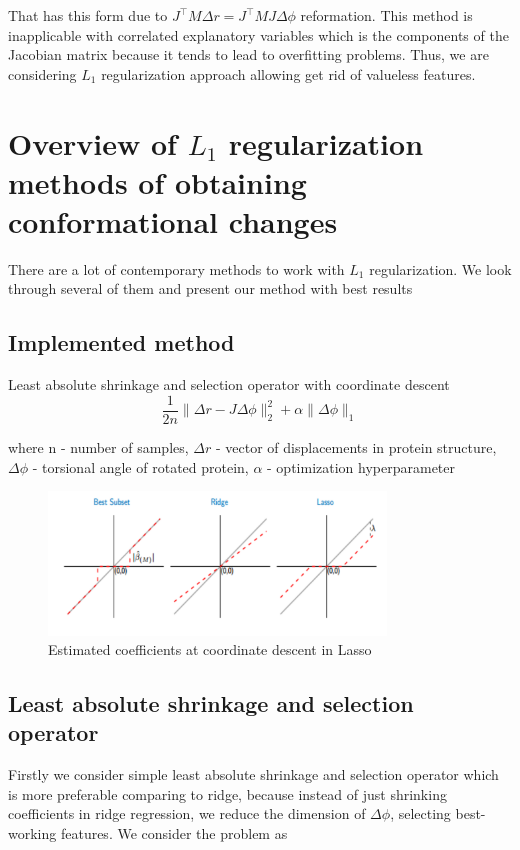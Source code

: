 \documentclass[12pt,twoside]{article}
\newcommand\red[1]{{\color{red}#1}}
\begin{document}
That has this form due to $J^{\top}M\Delta r = J^{\top}M J \Delta \phi$ reformation. This method is inapplicable with correlated explanatory variables which is the components of the Jacobian matrix because it tends to lead to overfitting problems. Thus, we are considering $L_1$ regularization approach allowing get rid of valueless features. 
 
 \section{Overview of $L_1$ regularization methods of obtaining conformational changes }
 There are a lot of contemporary methods to work with $L_1$ regularization. We look through several of them and present our method with best results
 \subsection{\small{Implemented method}}
 Least absolute shrinkage and selection operator with coordinate descent 
 $$\frac{1}{2n}\|\Delta r-J\Delta\phi\|_2^2+\alpha \|\Delta\phi\|_1$$
 
 where n - number of samples, $\Delta r$ - vector of displacements in protein structure, $\Delta\phi$ - torsional angle of rotated protein, $\alpha$ - optimization hyperparameter
 
  \begin{figure}[h]
\centering
\includegraphics[width=0.8\textwidth]{lasso.pdf}
\caption{Estimated coefficients at coordinate descent in Lasso }
\label{fig:hist2}
\end{figure} 

 \subsection{\small{Least absolute shrinkage and selection operator}}
 Firstly we consider simple least absolute shrinkage and selection operator which is more preferable comparing to ridge, because instead of just shrinking coefficients in ridge regression, we reduce the dimension of $\Delta\phi$, selecting best-working features. 
 We consider the problem as 
 
\end{document}
